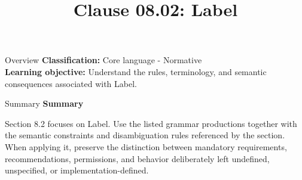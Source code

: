 \documentclass[10pt,letterpaper]{article}
\title{Clause 08.02: Label}
\author{}
\date{}
\begin{document}
\maketitle
\begin{CornellOverviewBox}{Overview}
\textbf{Classification:} Core language - Normative\\[2pt]
\textbf{Learning objective:} Understand the rules, terminology, and semantic consequences associated with Label.
\end{CornellOverviewBox}\begin{CornellSummaryBox}{Summary}
{\sffamily\bfseries\color{Accent} Summary}\par\vspace{3pt}Section 8.2 focuses on Label. Use the listed grammar productions together with the semantic constraints and disambiguation rules referenced by the section. When applying it, preserve the distinction between mandatory requirements, recommendations, permissions, and behavior deliberately left undefined, unspecified, or implementation-defined.
\end{CornellSummaryBox}
\end{document}
